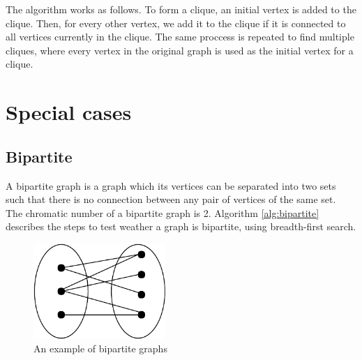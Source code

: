 \documentclass[a4paper]{report}
\begin{document}
		The algorithm works as follows. To form a clique, an initial vertex is added to the clique. Then, for every other vertex, we add it to the clique if it is connected to all vertices currently in the clique. The same proccess is repeated to find multiple cliques, where every vertex in the original graph is used as the initial vertex for a clique. 
		
		\section{Special cases}
			\subsection{Bipartite}
			A bipartite graph is a graph which its vertices can be separated into two sets such that there is no connection between any pair of vertices of the same set.\\
			The chromatic number of a bipartite graph is 2. Algorithm \ref{alg:bipartite} \cite{sedgewick2003} describes the steps to test weather a graph is bipartite, using breadth-first search. \\
			
			\begin{figure}[h]
				\centering
				\includegraphics[width=50mm,scale=0.5]{figures/bipartite.pdf}
				\caption{An example of bipartite graphs}
				\label{fig:bipartite}
			\end{figure}
			
\end{document}
